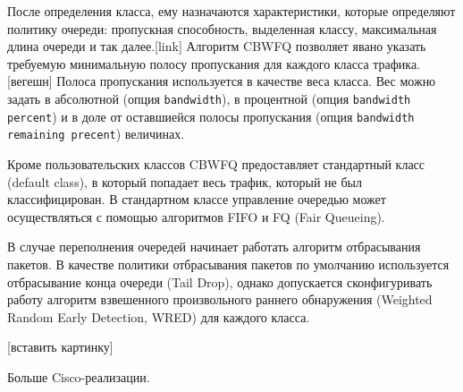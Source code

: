 	После определения класса, ему назначаются характеристики, которые определяют
	политику очереди: пропускная способность, выделенная классу, максимальная
	длина очереди и так далее.[link] Алгоритм CBWFQ позволяет явано указать требуемую минимальную
	полосу пропускания для каждого класса трафика.[вегешн] Полоса пропускания используется
	в качестве веса класса. Вес можно задать в абсолютной (опция \texttt{bandwidth}),
	в процентной (опция \texttt{bandwidth percent}) и в доле от оставшиейся
	полосы пропускания (опция \texttt{bandwidth remaining precent}) величинах.

	Кроме пользовательских классов CBWFQ предоставляет стандартный класс (default class),
	в который попадает весь трафик, который не был классифицирован. В стандартном классе
	управление очередью может осуществляться с помощью алгоритмов FIFO и FQ (Fair Queueing). 

	В случае переполнения очередей начинает работать алгоритм отбрасывания пакетов.
	В качестве политики отбрасывания пакетов по умолчанию используется отбрасывание конца
	очереди (Tail Drop), однако допускается сконфигуривать работу
	алгоритм взвешенного произвольного раннего обнаружения (Weighted Random Early Detection, WRED)
	для каждого класса.

	
    [вставить картинку]

	Больше Cisco-реализации.



